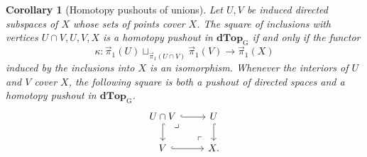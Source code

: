 \documentclass[12pt,a4paper]{amsart}
\newtheorem{corollary}[theorem]{Corollary}
\theoremstyle{definition}
\renewcommand{\vec}{\overrightarrow}
\newcommand{\D}{\mathbf{dTop}}
\newcommand{\MG}{\D_{\mathrm G}}
\newcommand{\PiC}{\vec{\pi}_1}
\begin{document}
\begin{corollary}[Homotopy pushouts of unions]\label{cor:cover}
Let $U,V$ be induced directed subspaces of $X$ whose sets of points cover $X$. The square of inclusions with vertices $U\cap V,U,V,X$ is a homotopy pushout in $\MG$ if and only if the functor
\[
 \kappa\colon\PiC(U)\sqcup_{\PiC(U\cap V)}\PiC(V)\longrightarrow\PiC(X)
\]
induced by the inclusions into $X$ is an isomorphism. Whenever the interiors of $U$ and $V$ cover $X$, the following square is both a pushout of directed spaces and a homotopy pushout in $\MG$.
\[
\begin{tikzcd}
 U\cap V\ar[r,hook]\ar[d,hook]\ar[dr,phantom,"\lrcorner",very near start]&U\ar[d,hook]\\
 V\ar[r,hook]&X\ar[ul,phantom,"\ulcorner",very near start].
\end{tikzcd}
\]
\end{corollary}
\end{document}
